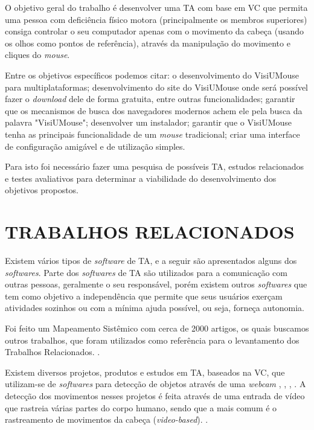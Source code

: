 O objetivo geral do trabalho é desenvolver uma TA com base em VC que permita uma pessoa com deficiência físico motora (principalmente os membros superiores) consiga controlar o seu computador apenas com o movimento da cabeça (usando os olhos como pontos de referência), através da manipulação do movimento e cliques do \textit{mouse}.


Entre os objetivos específicos podemos citar: o desenvolvimento do VisiUMouse para multiplataformas; desenvolvimento do site do VisiUMouse onde será possível fazer o \textit{download} dele de forma gratuita, entre outras funcionalidades; garantir que os mecanismos de busca dos navegadores modernos achem ele pela busca da palavra "VisiUMouse"; desenvolver um instalador; garantir que o VisiUMouse tenha as principais funcionalidade de um \textit{mouse} tradicional; criar uma interface de configuração amigável e de utilização simples.

Para isto foi necessário fazer uma pesquisa de possíveis TA, estudos relacionados e testes avaliativos para determinar a viabilidade do desenvolvimento dos objetivos propostos.
    
\section{TRABALHOS RELACIONADOS}\label{Sub:trabalhos-relacionados}

Existem vários tipos de  \textit{software} de TA, e a seguir são apresentados alguns dos \textit{softwares}. Parte dos \textit{softwares} de TA são utilizados para a comunicação com outras pessoas, geralmente o seu responsável, porém existem outros \textit{softwares} que tem como objetivo a independência que permite que seus usuários exerçam atividades sozinhos ou com a mínima ajuda possível, ou seja, forneça autonomia.

Foi feito um Mapeamento Sistêmico com cerca de 2000 artigos, os quais buscamos outros trabalhos, que foram utilizados como referência para o levantamento dos Trabalhos Relacionados. \cite{da2018best-UPPERCASE}.

Existem diversos projetos, produtos e estudos em TA, baseados na VC, que utilizam-se de \textit{softwares} para detecção de objetos através de uma \textit{webcam} \cite{ramos2016letras} , \cite{gips2000camera}, \cite{bian2016facial}, \cite{marnik2014blinkmouse}. A detecção dos movimentos nesses projetos é feita através de uma entrada de vídeo que rastreia várias partes do corpo humano, sendo que a mais comum é o rastreamento de movimentos da cabeça (\textit{video-based}). \cite{al2013eye-UPPERCASE}. 

